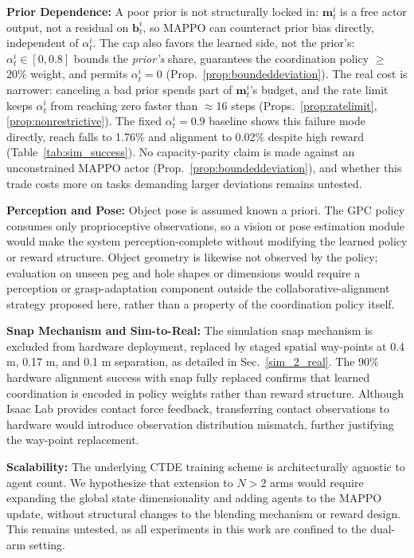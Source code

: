 \documentclass[a4paper,fleqn]{cas-dc}
\begin{document}
\noindent\textbf{Prior Dependence:} A poor prior is not structurally locked in: $\mathbf{m}_t^i$ is a free actor output, not a residual on $\mathbf{b}_t^i$, so MAPPO can counteract prior bias directly, independent of $\alpha_t^i$. The cap also favors the learned side, not the prior's: $\alpha_t^i \in [0,0.8]$ bounds the \emph{prior's} share, guarantees the coordination policy $\geq$20\% weight, and permits $\alpha_t^i=0$ (Prop.~\ref{prop:boundeddeviation}). The real cost is narrower: canceling a bad prior spends part of $\mathbf{m}_t^i$'s budget, and the rate limit keeps $\alpha_t^i$ from reaching zero faster than $\approx$16 steps (Props.~\ref{prop:ratelimit}, \ref{prop:nonrestrictive}). The fixed $\alpha_t^i=0.9$ baseline shows this failure mode directly, reach falls to 1.76\% and alignment to 0.02\% despite high reward (Table~\ref{tab:sim_success}). No capacity-parity claim is made against an unconstrained MAPPO actor (Prop.~\ref{prop:boundeddeviation}), and whether this trade costs more on tasks demanding larger deviations remains untested.

\noindent \textbf{Perception and Pose:} Object pose is assumed known a priori. The GPC policy consumes only proprioceptive observations, so a vision or pose estimation module would make the system perception-complete without modifying the learned policy or reward structure. Object geometry is likewise not observed by the policy; evaluation on unseen peg and hole shapes or dimensions would require a perception or grasp-adaptation component outside the collaborative-alignment strategy proposed here, rather than a property of the coordination policy itself.

\noindent\textbf{Snap Mechanism and Sim-to-Real:} The simulation snap mechanism is excluded from hardware deployment, replaced by staged spatial way-points at 0.4 m, 0.17 m, and 0.1 m separation, as detailed in Sec.~\ref{sim_2_real}. The 90\% hardware alignment success with snap fully replaced confirms that learned coordination is encoded in policy weights rather than reward structure. Although Isaac Lab provides contact force feedback, transferring contact observations to hardware would introduce observation distribution mismatch, further justifying the way-point replacement.

\noindent\textbf{Scalability:} The underlying CTDE training scheme is architecturally agnostic to agent count. We hypothesize that extension to $N>2$ arms would require expanding the global state dimensionality and adding agents to the MAPPO update, without structural changes to the blending mechanism or reward design. This remains untested, as all experiments in this work are confined to the dual-arm setting.
\end{document}
